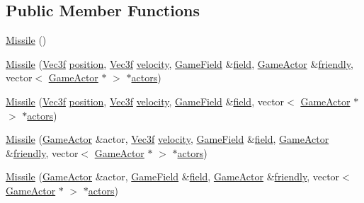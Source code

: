 \subsection*{Public Member Functions}
\begin{DoxyCompactItemize}
\item 
\hyperlink{class_missile_aa5ce8791a8e7ebd4ea0afab390b73a1a}{Missile} ()
\item 
\hyperlink{class_missile_ab29ebbc2d02cc1a73305eae95ffbabdf}{Missile} (\hyperlink{class_vec3f}{Vec3f} \hyperlink{class_game_actor_aefed3c91bf32ad388d86657b3bb9ddfa}{position}, \hyperlink{class_vec3f}{Vec3f} \hyperlink{class_game_actor_a95518bf01411eafe983df8815e8682d1}{velocity}, \hyperlink{class_game_field}{Game\+Field} \&\hyperlink{class_game_actor_a0224fbc502abd6b7579787aa234332d5}{field}, \hyperlink{class_game_actor}{Game\+Actor} \&\hyperlink{class_projectile_a54dec73f149e6619fac8f5cf8910edcc}{friendly}, vector$<$ \hyperlink{class_game_actor}{Game\+Actor} $\ast$ $>$ $\ast$\hyperlink{class_game_actor_a2405618d895f5143b42ae9e94d20e693}{actors})
\item 
\hyperlink{class_missile_a5e9af87a462fda5d18952bd2ae15e687}{Missile} (\hyperlink{class_vec3f}{Vec3f} \hyperlink{class_game_actor_aefed3c91bf32ad388d86657b3bb9ddfa}{position}, \hyperlink{class_vec3f}{Vec3f} \hyperlink{class_game_actor_a95518bf01411eafe983df8815e8682d1}{velocity}, \hyperlink{class_game_field}{Game\+Field} \&\hyperlink{class_game_actor_a0224fbc502abd6b7579787aa234332d5}{field}, vector$<$ \hyperlink{class_game_actor}{Game\+Actor} $\ast$ $>$ $\ast$\hyperlink{class_game_actor_a2405618d895f5143b42ae9e94d20e693}{actors})
\item 
\hyperlink{class_missile_adf23c9c4725f3080d3419f721c68b0f9}{Missile} (\hyperlink{class_game_actor}{Game\+Actor} \&actor, \hyperlink{class_vec3f}{Vec3f} \hyperlink{class_game_actor_a95518bf01411eafe983df8815e8682d1}{velocity}, \hyperlink{class_game_field}{Game\+Field} \&\hyperlink{class_game_actor_a0224fbc502abd6b7579787aa234332d5}{field}, \hyperlink{class_game_actor}{Game\+Actor} \&\hyperlink{class_projectile_a54dec73f149e6619fac8f5cf8910edcc}{friendly}, vector$<$ \hyperlink{class_game_actor}{Game\+Actor} $\ast$ $>$ $\ast$\hyperlink{class_game_actor_a2405618d895f5143b42ae9e94d20e693}{actors})
\item 
\hyperlink{class_missile_a5c947ed3d527a4ceed534a8280d2be5d}{Missile} (\hyperlink{class_game_actor}{Game\+Actor} \&actor, \hyperlink{class_game_field}{Game\+Field} \&\hyperlink{class_game_actor_a0224fbc502abd6b7579787aa234332d5}{field}, \hyperlink{class_game_actor}{Game\+Actor} \&\hyperlink{class_projectile_a54dec73f149e6619fac8f5cf8910edcc}{friendly}, vector$<$ \hyperlink{class_game_actor}{Game\+Actor} $\ast$ $>$ $\ast$\hyperlink{class_game_actor_a2405618d895f5143b42ae9e94d20e693}{actors})

\end{DoxyCompactItemize}
